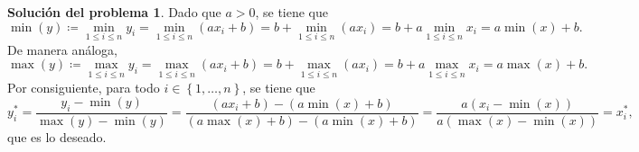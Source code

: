 \documentclass[twoside,12pt]{article}
\theoremstyle{definition}
\newtheorem{soln}{Solución del problema}
\begin{document}
\newpage
\begin{soln}
Dado que $a>0$, se tiene que
\[
\min(y)\coloneqq \min_{1\leq i\leq n} y_i=\min_{1\leq i\leq n}(ax_i+b) = b+\min_{1\leq i\leq n}(ax_i) = b+a\min_{1\leq i\leq n} x_i = a\min(x)+b.
\]
De manera análoga,
\[
\max(y)\coloneqq \max_{1\leq i\leq n} y_i=\max_{1\leq i\leq n}(ax_i+b) = b+\max_{1\leq i\leq n}(ax_i) = b+a\max_{1\leq i\leq n} x_i =a\max(x)+b.
\]
Por consiguiente, para todo $i\in \left\lbrace 1, \ldots, n \right\rbrace$, se tiene que
\[
y_i^* = \frac{y_i-\min(y)}{\max(y)-\min(y)} = \frac{\left(ax_i+b\right)-\left(a\min(x)+b\right)}{\left(a\max(x)+b\right)-\left(a\min(x)+b\right)} = \frac{a\left(x_i-\min(x)\right)}{a\left(\max(x)-\min(x)\right)} = x_i^*,
\]
que es lo deseado.
\end{soln}

\newpage
\end{document}
